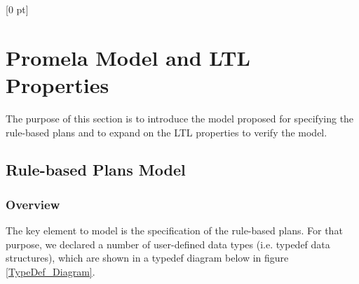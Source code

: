 \titlespacing{\chapter}{0 pt}{30 pt}{50 pt}[0 pt]
\titleformat{\section}{\Large\bfseries}{\thesection}{0 pt}{\hspace{30 pt}}
\titleformat{\subsection}{\large\bfseries}{\thesubsection}{0 pt}{\hspace{30 pt}}
\pagestyle{fancy}
\fancyhead[LO,LE]{\footnotesize\textit{\leftmark}}
\fancyhead[RO,RE]{\thepage}
\fancyfoot[CO,CE]{}

\chapter{Promela Model and LTL Properties} %

\lstset{
language=Promela,
numbers=left,
numberstyle=\small,
frame=tb,
columns=fullflexible,
showstringspaces=false,
framexleftmargin=15pt
}

\normalsize
\noindent
The purpose of this section is to introduce the model proposed for specifying the rule-based plans and to expand on the LTL properties to verify the model.  
\section{Rule-based Plans Model}
\subsection{Overview}
\noindent
The key element to model is the specification of the rule-based plans. For that purpose, we declared a number of user-defined data types (i.e. typedef data structures), which are shown in a typedef diagram below in figure \ref{TypeDef_Diagram}. \\

